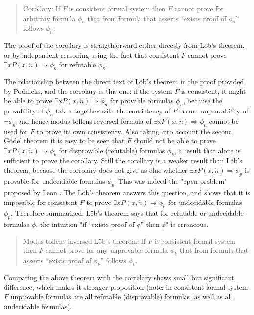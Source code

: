 \documentclass[12pt]{article}
\begin{document}
\begin{verse}
Corollary: If $F$ is consistent formal system then $F$ cannot prove for arbitrary formula $\phi_{n}$ that from formula that asserts {}``exists proof of $\phi_{n}$'' follows $\phi_{n}$.
\end{verse}

The proof of the corollary is straigthforward either directly from L\"ob's theorem, or by independent reasoning using the fact that consistent $F$ cannot prove $\exists xP(x,\check{n})\Rightarrow\phi_{k}$ for refutable $\phi_{k}$.

The relationship between the direct text of L\"ob's theorem in the proof provided by Podnieks, and the corrolary is this one: if the system $F$ is consistent, it might be able to prove $\exists xP(x,\check{n})\Rightarrow\phi_{n}$ for provable formulas $\phi_{n}$, because the provability of $\phi_{n}$ taken together with the consistency of $F$ ensure unprovability of $\neg \phi_{n}$ and hence modus tollens reversed formula of $\exists xP(x,\check{n})\Rightarrow\phi_{n}$ cannot be used for $F$ to prove its own consistency. Also taking into account the second G\"odel theorem it is easy to be seen that $F$ should not be able to prove $\exists xP(x,\check{n})\Rightarrow\phi_{k}$ for disprovable (refutable) formulas $\phi_{k}$, a result that alone is sufficient to prove the corollary. Still the corollary is a weaker result than L\"ob's theorem, because the corrolary does not give us clue whether $\exists xP(x,\check{n})\Rightarrow\phi_{p}$ is provable for undecidable formulas $\phi_{p}$. This was indeed the "open problem" proposed by Leon . The L\"ob's theorem answers this question, and shows that it is impossible for consistent $F$ to prove $\exists xP(x,\check{n})\Rightarrow\phi_{p}$ for undecidable formulas $\phi_{p}$. Therefore summarized, L\"ob's theorem says that for refutable or undecidable formulas $\phi$, the intuition "if {}``exists proof of $\phi$'' then $\phi$" is erroneous.

\begin{verse}
Modus tollens inversed L\"ob's theorem: If $F$ is consistent formal system then $F$ cannot prove for any unprovable formula $\phi_{k}$ that from formula that asserts {}``exists proof of $\phi_{k}$'' follows $\phi_{k}$.
\end{verse}

Comparing the above theorem with the corrolary shows small but significant difference, which makes it stronger proposition (note: in consistent formal system $F$ unprovable formulas are all refutable (disprovable) formulas, as well as all undecidable formulas).
\end{document}
